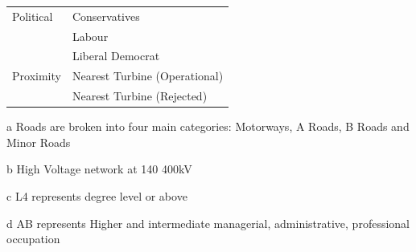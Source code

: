 \documentclass[a4paper,]{article}
\theoremstyle{definition}
\theoremstyle{definition}
\theoremstyle{definition}
\theoremstyle{remark}
\begin{document}
\begin{table}
\begin{threeparttable}
\begin{tabular}[t]{ll}
Political & Conservatives\\
 & Labour\\
 & Liberal Democrat\\
Proximity & Nearest Turbine (Operational)\\
 & Nearest Turbine (Rejected)\\
\bottomrule
\end{tabular}
\begin{tablenotes}
\small
\item[a] Roads are broken into four main categories: Motorways, A Roads, B Roads and Minor Roads
\item[b] High Voltage network at 140 400kV
\item[c] L4 represents degree level or above
\item[d] AB represents Higher and intermediate managerial, administrative, professional occupation
\end{tablenotes}
\end{threeparttable}
\end{table}
\end{document}
